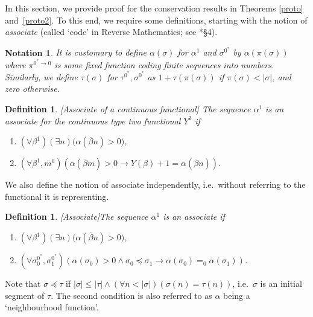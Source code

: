 \documentclass[reqno]{amsart}
\newtheorem{defi}[thm]{Definition}
\newtheorem{nota}[thm]{Notation}
\def\bdefi{\begin{defi}\rm}
\def\edefi{\end{defi}}
\def\bnota{\begin{nota}\rm}
\def\enota{\end{nota}}
\def\di{\rightarrow}
\numberwithin{equation}{section}
\numberwithin{thm}{section}
\begin{document}
In this section, we provide proof for the conservation results in Theorems \ref{proto} and~\ref{proto2}.  
To this end, we require some definitions, starting with the notion of \emph{associate} (called `code' in Reverse Mathematics; see \cite{kohlenbach4}*{\S4}).  
\bnota
It is customary to define $\alpha(\sigma)$ for $\alpha^{1}$ and $\sigma^{0^{*}}$ by $\alpha(\pi(\sigma))$ where $\pi^{0^{*}\di 0}$ is some fixed function coding finite sequences into numbers.  Similarly, we define $\tau(\sigma)$ for $\tau^{0^{*}},\sigma^{0^{*}}$ as $1+\tau(\pi(\sigma))$ if $\pi(\sigma)<|\sigma|$, and zero otherwise.  
\enota
\bdefi[Associate of a continuous functional]
The sequence $\alpha^{1}$ is an \emph{associate} for the continuous type two functional $Y^{2}$ if
\begin{enumerate} 
\item $(\forall \beta^{1})(\exists n)\big(\alpha(\overline{\beta}n)>0\big)$,
\item $(\forall \beta^{1}, m^{0})(  \alpha(\overline{\beta}m)>0\di Y(\beta)+1=\alpha(\overline{\beta}n))$.
\end{enumerate}
\edefi
We also define the notion of associate independently, i.e.\ without referring to the functional it is representing.  
\bdefi[Associate]\label{wass}
The sequence $\alpha^{1}$ is an \emph{associate} if 
\begin{enumerate} 
\item $(\forall \beta^{1})(\exists n)\big(\alpha(\overline{\beta}n)>0\big)$,
\item $(\forall \sigma_{0}^{0^{*}}, \sigma_{1}^{0^{*}})(\alpha({\sigma_{0}})>0 \wedge \sigma_{0}\preceq \sigma_{1} \di \alpha({\sigma_{0}})=_{0}\alpha(\sigma_{1}) )   $.
\end{enumerate}
\edefi
Note that $\sigma\preceq\tau$ if $|\sigma|\leq |\tau|\wedge (\forall n<|\sigma|)(\sigma(n)=\tau(n))$, i.e.\ $\sigma$ is an initial segment of $\tau$.  
The second condition is also referred to as $\alpha$ being a `neighbourhood function'.  
\end{document}
